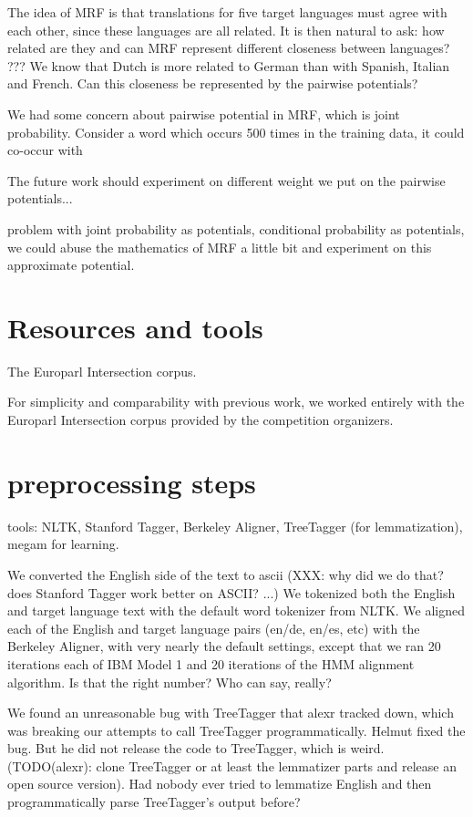\documentclass[11pt,letterpaper]{article}
\begin{document}
The idea of MRF is that translations for five target languages must agree with
each other, since these languages are all related.  It is then natural to ask:
how related are they and can MRF represent different closeness between
languages?  ???  We know that Dutch is more related to German than with
Spanish, Italian and French. Can this closeness be represented by the pairwise
potentials?

We had some concern about pairwise potential in MRF, which is joint
probability. Consider a word which occurs 500 times in the training data, it
could co-occur with

The future work should experiment on different weight we put on the pairwise
potentials...

problem with joint probability as potentials, conditional probability as
potentials, we could abuse the mathematics of MRF a little bit and experiment
on this approximate potential.

\section{Resources and tools}
The Europarl Intersection corpus.

For simplicity and comparability with previous work, we worked entirely with
the Europarl Intersection corpus provided by the competition organizers.
	

\section{preprocessing steps}
tools: NLTK, Stanford Tagger, Berkeley Aligner, TreeTagger (for lemmatization),
megam for learning.

We converted the English side of the text to ascii (XXX: why did we do that?
does Stanford Tagger work better on ASCII? ...) We tokenized both the English
and target language text with the default word tokenizer from NLTK.  We aligned
each of the English and target language pairs (en/de, en/es, etc) with the
Berkeley Aligner, with very nearly the default settings, except that we ran 20
iterations each of IBM Model 1 and 20 iterations of the HMM alignment
algorithm. Is that the right number? Who can say, really?

We found an unreasonable bug with TreeTagger that alexr tracked down, which was
breaking our attempts to call TreeTagger programmatically. Helmut fixed the
bug. But he did not release the code to TreeTagger, which is weird.
(TODO(alexr): clone TreeTagger or at least the lemmatizer parts and release an
open source version). Had nobody ever tried to lemmatize English and then
programmatically parse TreeTagger's output before?
\end{document}
